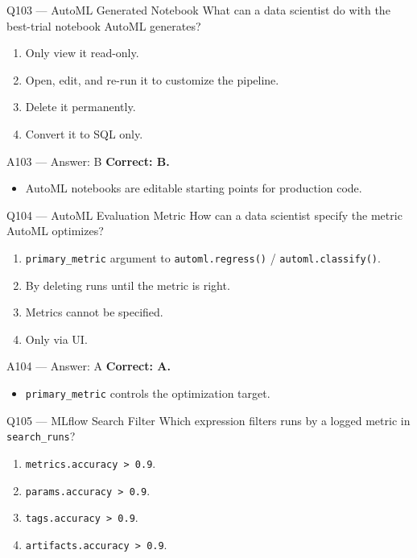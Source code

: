 \documentclass[aspectratio=169,9pt]{beamer}
\begin{document}
	\begin{frame}{Q103 --- AutoML Generated Notebook}
		What can a data scientist do with the best-trial notebook AutoML generates?
		\begin{enumerate}[label=\Alph*.]
			\item Only view it read-only.
			\item Open, edit, and re-run it to customize the pipeline.
			\item Delete it permanently.
			\item Convert it to SQL only.
		\end{enumerate}
	\end{frame}
	
	\begin{frame}{A103 --- Answer: B}
		\textbf{Correct: B.}
		\begin{itemize}
			\item AutoML notebooks are editable starting points for production code.
		\end{itemize}
	\end{frame}
	
	\begin{frame}{Q104 --- AutoML Evaluation Metric}
		How can a data scientist specify the metric AutoML optimizes?
		\begin{enumerate}[label=\Alph*.]
			\item \texttt{primary\_metric} argument to \texttt{automl.regress()} / \texttt{automl.classify()}.
			\item By deleting runs until the metric is right.
			\item Metrics cannot be specified.
			\item Only via UI.
		\end{enumerate}
	\end{frame}
	
	\begin{frame}{A104 --- Answer: A}
		\textbf{Correct: A.}
		\begin{itemize}
			\item \texttt{primary\_metric} controls the optimization target.
		\end{itemize}
	\end{frame}
	
	\begin{frame}{Q105 --- MLflow Search Filter}
		Which expression filters runs by a logged metric in \texttt{search\_runs}?
		\begin{enumerate}[label=\Alph*.]
			\item \texttt{metrics.accuracy > 0.9}.
			\item \texttt{params.accuracy > 0.9}.
			\item \texttt{tags.accuracy > 0.9}.
			\item \texttt{artifacts.accuracy > 0.9}.
		\end{enumerate}
	\end{frame}
	
\end{document}
